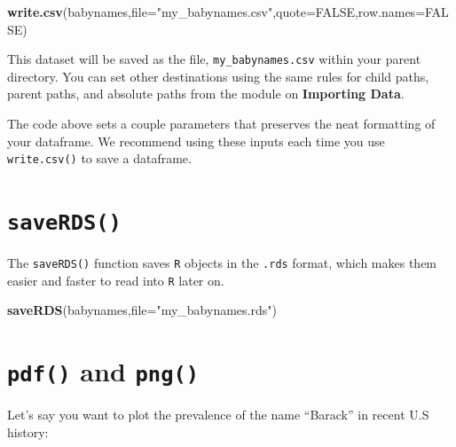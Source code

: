 \documentclass[]{book}
\newenvironment{Shaded}{\begin{snugshade}}{\end{snugshade}}
\newcommand{\DataTypeTok}[1]{\textcolor[rgb]{0.13,0.29,0.53}{#1}}
\newcommand{\KeywordTok}[1]{\textcolor[rgb]{0.13,0.29,0.53}{\textbf{#1}}}
\newcommand{\NormalTok}[1]{#1}
\newcommand{\OtherTok}[1]{\textcolor[rgb]{0.56,0.35,0.01}{#1}}
\newcommand{\StringTok}[1]{\textcolor[rgb]{0.31,0.60,0.02}{#1}}
\begin{document}
\begin{Shaded}
\begin{Highlighting}[]
\KeywordTok{write.csv}\NormalTok{(babynames,}\DataTypeTok{file=}\StringTok{"my_babynames.csv"}\NormalTok{,}\DataTypeTok{quote=}\OtherTok{FALSE}\NormalTok{,}\DataTypeTok{row.names=}\OtherTok{FALSE}\NormalTok{)}
\end{Highlighting}
\end{Shaded}

This dataset will be saved as the file, \texttt{my\_babynames.csv} within your parent directory. You can set other destinations using the same rules for child paths, parent paths, and absolute paths from the module on \textbf{Importing Data}.

The code above sets a couple parameters that preserves the neat formatting of your dataframe. We recommend using these inputs each time you use \texttt{write.csv()} to save a dataframe.

\hypertarget{saverds}{%
\section*{\texorpdfstring{\texttt{saveRDS()}}{saveRDS()}}\label{saverds}}

The \texttt{saveRDS()} function saves \texttt{R} objects in the \texttt{.rds} format, which makes them easier and faster to read into \texttt{R} later on.

\begin{Shaded}
\begin{Highlighting}[]
\KeywordTok{saveRDS}\NormalTok{(babynames,}\DataTypeTok{file=}\StringTok{"my_babynames.rds"}\NormalTok{)}
\end{Highlighting}
\end{Shaded}

\hypertarget{pdf-and-png}{%
\section*{\texorpdfstring{\texttt{pdf()} and \texttt{png()}}{pdf() and png()}}\label{pdf-and-png}}

Let's say you want to plot the prevalence of the name ``Barack'' in recent U.S history:
\end{document}

